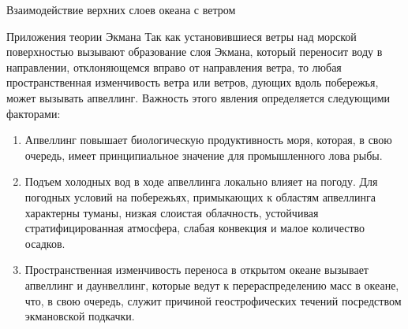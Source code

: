 \begin{chapter}{Взаимодействие верхних слоев океана с ветром}
\begin{section}{Приложения теории Экмана}
Так как установившиеся ветры над морской поверхностью вызывают образование
слоя Экмана, который переносит воду
в направлении, отклоняющемся вправо от направления ветра, то любая
пространственная изменчивость ветра или ветров, дующих вдоль побережья,
может вызывать апвеллинг. 
Важность этого явления определяется следующими
факторами:
%
%
\begin{enumerate}
\item 
Апвеллинг повышает биологическую продуктивность моря, которая, в свою
очередь, имеет принципиальное значение для промышленного лова рыбы.
%

\item 
Подъем холодных вод в ходе апвеллинга локально влияет на погоду. Для погодных
условий на побережьях, примыкающих к областям 
апвеллинга характерны туманы, 
низкая слоистая облачность, устойчивая стратифицированная атмосфера, слабая
конвекция и малое количество осадков.
%

\item 
Пространственная изменчивость переноса в открытом океане вызывает 
апвеллинг и даунвеллинг, 
которые ведут к перераспределению масс в океане, что, в свою очередь,
служит причиной геострофических 
течений посредством
экмановской подкачки.
%
\end{enumerate}


\end{section}
\end{chapter}
